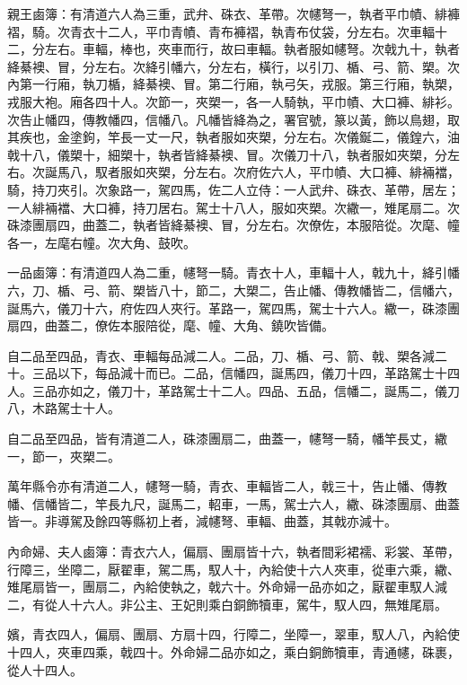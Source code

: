 \begin{pinyinscope}
 親王鹵簿：有清道六人為三重，武弁、硃衣、革帶。次幰弩一，執者平巾幘、緋褲褶，騎。次青衣十二人，平巾青幘、青布褲褶，執青布仗袋，分左右。次車輻十二，分左右。車輻，棒也，夾車而行，故曰車輻。執者服如幰弩。次戟九十，執者絳綦襖、冒，分左右。次絳引幡六，分左右，橫行，以引刀、楯、弓、箭、槊。次內第一行廂，執刀楯，絳綦襖、冒。第二行廂，執弓矢，戎服。第三行廂，執槊，戎服大袍。廂各四十人。次節一，夾槊一，各一人騎執，平巾幘、大口褲、緋衫。次告止幡四，傳教幡四，信幡八。凡幡皆絳為之，署官號，篆以黃，飾以鳥翅，取其疾也，金塗鉤，竿長一丈一尺，執者服如夾槊，分左右。次儀鋋二，儀鍠六，油戟十八，儀槊十，細槊十，執者皆絳綦襖、冒。次儀刀十八，執者服如夾槊，分左右。次誕馬八，馭者服如夾槊，分左右。次府佐六人，平巾幘、大口褲、緋裲襠，騎，持刀夾引。次象路一，駕四馬，佐二人立侍：一人武弁、硃衣、革帶，居左；一人緋裲襠、大口褲，持刀居右。駕士十八人，服如夾槊。次繖一，雉尾扇二。次硃漆團扇四，曲蓋二，執者皆絳綦襖、冒，分左右。次僚佐，本服陪從。次麾、幢各一，左麾右幢。次大角、鼓吹。



 一品鹵簿：有清道四人為二重，幰弩一騎。青衣十人，車輻十人，戟九十，絳引幡六，刀、楯、弓、箭、槊皆八十，節二，大槊二，告止幡、傳教幡皆二，信幡六，誕馬六，儀刀十六，府佐四人夾行。革路一，駕四馬，駕士十六人。繖一，硃漆團扇四，曲蓋二，僚佐本服陪從，麾、幢、大角、鐃吹皆備。



 自二品至四品，青衣、車輻每品減二人。二品，刀、楯、弓、箭、戟、槊各減二十。三品以下，每品減十而已。二品，信幡四，誕馬四，儀刀十四，革路駕士十四人。三品亦如之，儀刀十，革路駕士十二人。四品、五品，信幡二，誕馬二，儀刀八，木路駕士十人。



 自二品至四品，皆有清道二人，硃漆團扇二，曲蓋一，幰弩一騎，幡竿長丈，繖一，節一，夾槊二。



 萬年縣令亦有清道二人，幰弩一騎，青衣、車輻皆二人，戟三十，告止幡、傳教幡、信幡皆二，竿長九尺，誕馬二，軺車，一馬，駕士六人，繖、硃漆團扇、曲蓋皆一。非導駕及餘四等縣初上者，減幰弩、車輻、曲蓋，其戟亦減十。



 內命婦、夫人鹵簿：青衣六人，偏扇、團扇皆十六，執者間彩裙襦、彩裳、革帶，行障三，坐障二，厭翟車，駕二馬，馭人十，內給使十六人夾車，從車六乘，繖、雉尾扇皆一，團扇二，內給使執之，戟六十。外命婦一品亦如之，厭翟車馭人減二，有從人十六人。非公主、王妃則乘白銅飾犢車，駕牛，馭人四，無雉尾扇。



 嬪，青衣四人，偏扇、團扇、方扇十四，行障二，坐障一，翠車，馭人八，內給使十四人，夾車四乘，戟四十。外命婦二品亦如之，乘白銅飾犢車，青通幰，硃裹，從人十四人。




\end{pinyinscope}

